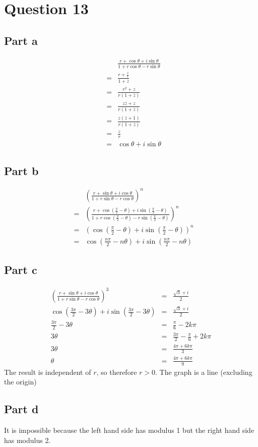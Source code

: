 \section*{Question 13}
\subsection*{Part a}
\begin{eqnarray*}
  & & \frac{r + \cos\theta + i\sin\theta}{1 + r\cos\theta - r\sin\theta} \\
  &=& \frac{r + \frac{z}{r}}{1 + \overline{z}} \\
  &=& \frac{r^2 + z}{r(1 + \overline{z})} \\  
  &=& \frac{z\overline{z} + z}{r(1 + \overline{z})} \\  
  &=& \frac{z(\overline{z} + 1)}{r(1 + \overline{z})} \\  
  &=& \frac{z}{r} \\  
  &=& \cos\theta + i\sin\theta
\end{eqnarray*}
\subsection*{Part b}
\begin{eqnarray*}
  & & \left(\frac{r + \sin\theta + i\cos\theta}{1 + r\sin\theta - r\cos\theta}\right)^n \\
  &=& \left(\frac{r + \cos\left(\frac{\pi}{2} - \theta\right) + i\sin\left(\frac{\pi}{2} - \theta\right)}{1 + r\cos\left(\frac{\pi}{2} - \theta\right) - r\sin\left(\frac{\pi}{2} - \theta\right)}\right)^n \\
  &=& \left(\cos\left(\frac{\pi}{2} - \theta\right) + i\sin\left(\frac{\pi}{2} - \theta\right)\right)^n \\
  &=& \cos\left(\frac{n\pi}{2} - n\theta\right) + i \sin\left(\frac{n\pi}{2} - n\theta\right)
\end{eqnarray*}
\subsection*{Part c}
\begin{eqnarray*}
  \left(\frac{r + \sin\theta + i\cos\theta}{1 + r\sin\theta - r\cos\theta}\right)^3 &=& \frac{\sqrt{3} + i}{2} \\
  \cos\left(\frac{3\pi}{2} - 3\theta\right) + i \sin\left(\frac{3\pi}{2} - 3\theta\right) &=& \frac{\sqrt{3} + i}{2} \\
  \frac{3\pi}{2} - 3\theta &=& \frac{\pi}{6} - 2k\pi \\
  3\theta &=& \frac{3\pi}{2} - \frac{\pi}{6} + 2k\pi \\
  3\theta &=& \frac{4\pi + 6k\pi}{3} \\
    \theta &=& \frac{4\pi + 6k\pi}{9}
\end{eqnarray*}
The result is independent of $ r $, so therefore $ r > 0 $. The graph is a line (excluding the origin) 
\subsection*{Part d}
It is impossible because the left hand side has modulus 1 but the right hand side has modulus 2.